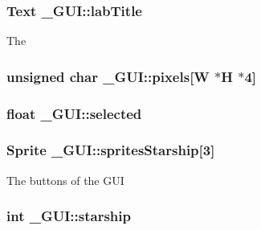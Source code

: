\subsubsection[{\texorpdfstring{lab\+Title}{labTitle}}]{\setlength{\rightskip}{0pt plus 5cm}Text \+\_\+\+G\+U\+I\+::lab\+Title}\hypertarget{struct___g_u_i_ac071b81e22679f8a23e323288a3b83d5}{}\label{struct___g_u_i_ac071b81e22679f8a23e323288a3b83d5}
The 
\subsubsection[{\texorpdfstring{pixels}{pixels}}]{\setlength{\rightskip}{0pt plus 5cm}unsigned char \+\_\+\+G\+U\+I\+::pixels\mbox{[}{\bf W} $\ast${\bf H} $\ast$4\mbox{]}}\hypertarget{struct___g_u_i_a67e0559e0707a7f3aa71f40c7ce55588}{}\label{struct___g_u_i_a67e0559e0707a7f3aa71f40c7ce55588}
\subsubsection[{\texorpdfstring{selected}{selected}}]{\setlength{\rightskip}{0pt plus 5cm}float \+\_\+\+G\+U\+I\+::selected}\hypertarget{struct___g_u_i_aa43c86faaad13f5f449b1dca0cbd5284}{}\label{struct___g_u_i_aa43c86faaad13f5f449b1dca0cbd5284}
\subsubsection[{\texorpdfstring{sprites\+Starship}{spritesStarship}}]{\setlength{\rightskip}{0pt plus 5cm}Sprite \+\_\+\+G\+U\+I\+::sprites\+Starship\mbox{[}3\mbox{]}}\hypertarget{struct___g_u_i_a6ff2172df7d8b7729200ea24148110a1}{}\label{struct___g_u_i_a6ff2172df7d8b7729200ea24148110a1}
The buttons of the G\+UI 
\subsubsection[{\texorpdfstring{starship}{starship}}]{\setlength{\rightskip}{0pt plus 5cm}int \+\_\+\+G\+U\+I\+::starship}\hypertarget{struct___g_u_i_a00234ae245e91bfcdc4997cbfd8d275d}{}\label{struct___g_u_i_a00234ae245e91bfcdc4997cbfd8d275d}
